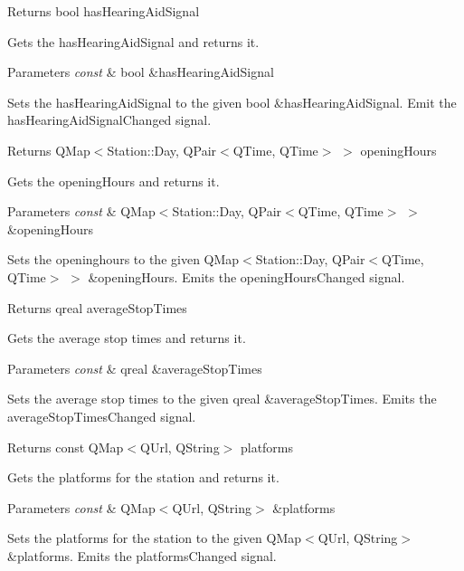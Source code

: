 \begin{DoxyReturn}{Returns}
bool has\+Hearing\+Aid\+Signal
\end{DoxyReturn}
Gets the has\+Hearing\+Aid\+Signal and returns it.


\begin{DoxyParams}{Parameters}
{\em const} & bool \&has\+Hearing\+Aid\+Signal\\
\hline
\end{DoxyParams}
Sets the has\+Hearing\+Aid\+Signal to the given bool \&has\+Hearing\+Aid\+Signal. Emit the has\+Hearing\+Aid\+Signal\+Changed signal.

\begin{DoxyReturn}{Returns}
Q\+Map$<$Station\+::\+Day, Q\+Pair$<$\+Q\+Time, Q\+Time$>$ $>$ opening\+Hours
\end{DoxyReturn}
Gets the opening\+Hours and returns it.


\begin{DoxyParams}{Parameters}
{\em const} & Q\+Map$<$Station\+::\+Day, Q\+Pair$<$\+Q\+Time, Q\+Time$>$ $>$ \&opening\+Hours\\
\hline
\end{DoxyParams}
Sets the openinghours to the given Q\+Map$<$Station\+::\+Day, Q\+Pair$<$\+Q\+Time, Q\+Time$>$ $>$ \&opening\+Hours. Emits the opening\+Hours\+Changed signal.

\begin{DoxyReturn}{Returns}
qreal average\+Stop\+Times
\end{DoxyReturn}
Gets the average stop times and returns it.


\begin{DoxyParams}{Parameters}
{\em const} & qreal \&average\+Stop\+Times\\
\hline
\end{DoxyParams}
Sets the average stop times to the given qreal \&average\+Stop\+Times. Emits the average\+Stop\+Times\+Changed signal.

\begin{DoxyReturn}{Returns}
const Q\+Map$<$\+Q\+Url, Q\+String$>$ platforms
\end{DoxyReturn}
Gets the platforms for the station and returns it.


\begin{DoxyParams}{Parameters}
{\em const} & Q\+Map$<$\+Q\+Url, Q\+String$>$ \&platforms\\
\hline
\end{DoxyParams}
Sets the platforms for the station to the given Q\+Map$<$\+Q\+Url, Q\+String$>$ \&platforms. Emits the platforms\+Changed signal. 